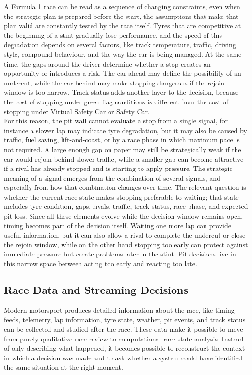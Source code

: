 A Formula 1 race can be read as a sequence of changing constraints, even when the strategic plan is prepared before the start, the assumptions that make that plan valid are
constantly tested by the race itself. Tyres that are competitive at the beginning of a stint gradually lose performance, and the speed of this degradation depends
on several factors, like track temperature, traffic, driving style, compound behaviour, and the way the car is being managed. At the same time, the gaps around
the driver determine whether a stop creates an opportunity or introduces a risk. The car ahead may define the possibility of an undercut, while the car behind may make
stopping dangerous if the rejoin window is too narrow. Track status adds another layer to the decision, because the cost of stopping under green flag conditions is different
from the cost of stopping under Virtual Safety Car or Safety Car.\\
For this reason, the pit wall cannot evaluate a stop from a single signal, for instance a slower lap may indicate tyre degradation, but it may also be caused by traffic, fuel saving,
lift-and-coast, or by a race phase in which maximum pace is not required. A large enough gap on paper may still be strategically weak if the car would rejoin behind slower
traffic, while a smaller gap can become attractive if a rival has already stopped and is starting to apply pressure. The strategic meaning of a signal emerges from the
combination of several signals, and especially from how that combination changes over time.
The relevant question is 
whether the current race state makes stopping preferable to waiting; that state includes tyre condition, gaps, rivals, traffic,
track status, race phase, and expected pit loss. Since all these elements evolve while the decision window remains open, timing becomes part of the decision itself.
Waiting one more lap can provide useful information, but it can also allow a rival to complete the undercut or close the rejoin window, while on the other hand stopping too early
can protect against immediate pressure but create problems later in the stint. Pit decisions live in this narrow space between acting too early and reacting too late.

\subsection{Race Data and Streaming Decisions}

Modern motorsport produces detailed information about the race, like timing feeds, telemetry, lap information, tyre state, weather, pit events, and track status can be collected
and studied after the race. These data make it possible to move from purely qualitative race review to computational race state analysis. Instead of only describing what happened,
it becomes possible to reconstruct the context in which a decision was made and to ask whether a system could have identified the same situation at the right moment.

